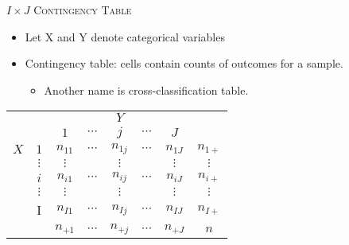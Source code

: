 \documentclass[dvipdfmx, serif,handout]{beamer}
\begin{document}
\begin{frame}{\textsc{$I \times J$ Contingency Table}}
\begin{itemize}
\item Let X and Y denote categorical variables
\item Contingency table: cells contain counts of outcomes for a sample.
\begin{itemize}
\item  Another name is cross-classification table. 
\end{itemize}
\end{itemize}

\centering
\begin{tabular}{cc|ccccc|c}
\hline
&		&\multicolumn{5}{c|}{$Y$}  & \\
&		&{$1$}  		&	{$\cdots$}		&	{$j$} 		&	{$\cdots$} &{$J$}  & \\\hline
$X$&$1$ 		& $n_{11}$ 	&	$\cdots$ 			&	$n_{1j}$ 	&	$\cdots$ 	&	$n_{1J}$&  $n_{1+}$ \\
&$\vdots$  	& $\vdots$ 	&		 		 	&	$\vdots$ 	&		 	&	$\vdots$&  $\vdots$ 	 \\
&{$i$} 		& {$n_{i1}$} 	&	{$\cdots$}	 	&	{$n_{ij}$} 	&	{$\cdots$}	&	{$n_{iJ}$}&  $n_{i+}$ \\
&$\vdots$ 	& $\vdots$ 	&		 		 	&	$\vdots$ 	&		 	&	$\vdots$&  $\vdots$ 	 \\
&I 		& $n_{I1}$ 	&	$\cdots$ 			&	$n_{Ij}$ 	&	$\cdots$ 	&	$n_{IJ}$&  $n_{I+}$ \\\hline
&		& $n_{+1}$ 	&	$\cdots$ 			&	$n_{+j}$ 	&	$\cdots$ 	&	$n_{+J}$&  $n$ \\
\end{tabular}
\end{frame}
\end{document}
